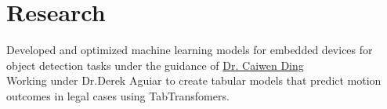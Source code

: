 \documentclass[]{resume-template}
\begin{document}
\begin{minipage}[t]{0.66\textwidth}


	\section{Research}\label{sec:research}
	\textbullet{} Developed and optimized machine learning models for embedded devices for object detection tasks under the guidance of \href{https://caiwending.cse.uconn.edu/}{Dr. Caiwen Ding} \\
	\textbullet{} Working under Dr.Derek Aguiar to create tabular models that predict motion outcomes in legal cases using TabTransfomers.




\end{minipage}
\end{document}
